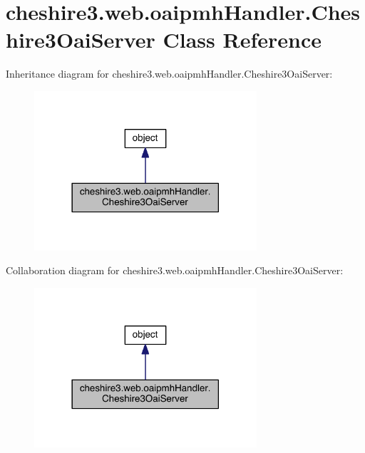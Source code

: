 \hypertarget{classcheshire3_1_1web_1_1oaipmh_handler_1_1_cheshire3_oai_server}{\section{cheshire3.\-web.\-oaipmh\-Handler.\-Cheshire3\-Oai\-Server Class Reference}
\label{classcheshire3_1_1web_1_1oaipmh_handler_1_1_cheshire3_oai_server}
}


Inheritance diagram for cheshire3.\-web.\-oaipmh\-Handler.\-Cheshire3\-Oai\-Server\-:
\nopagebreak
\begin{figure}[H]
\begin{center}
\leavevmode
\includegraphics[width=234pt]{classcheshire3_1_1web_1_1oaipmh_handler_1_1_cheshire3_oai_server__inherit__graph}
\end{center}
\end{figure}


Collaboration diagram for cheshire3.\-web.\-oaipmh\-Handler.\-Cheshire3\-Oai\-Server\-:
\nopagebreak
\begin{figure}[H]
\begin{center}
\leavevmode
\includegraphics[width=234pt]{classcheshire3_1_1web_1_1oaipmh_handler_1_1_cheshire3_oai_server__coll__graph}
\end{center}
\end{figure}
